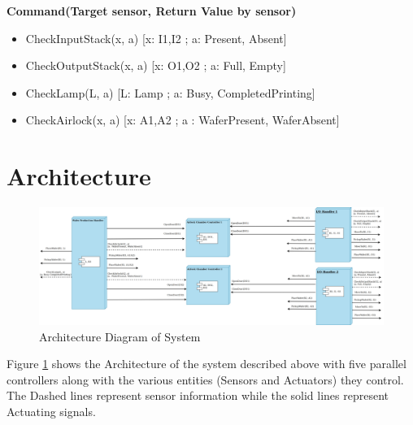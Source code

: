\documentclass[a4paper,12pt]{article}
\begin{document}
\textbf{Command(Target sensor, Return Value by sensor)}
\begin{itemize}
\item CheckInputStack(x, a)              [x: I1,I2 ; a: Present, Absent] 
\item CheckOutputStack(x, a)          [x: O1,O2 ; a: Full, Empty]
\item CheckLamp(L, a)	                  [L: Lamp ; a: Busy, CompletedPrinting]	
\item CheckAirlock(x, a)                    [x: A1,A2 ; a : WaferPresent, WaferAbsent]  %
\end{itemize}
\newpage
\section{Architecture}
\begin{figure}[h!]
  \includegraphics[width=\linewidth]{Architecture.jpg}
  \caption{Architecture Diagram of System}
  \label{fig:arch1}
\end{figure}
Figure \ref{fig:arch1} shows the Architecture of the system described above with five parallel controllers along with the various entities (Sensors and Actuators) they control. The Dashed lines represent sensor information while the solid lines represent Actuating signals.
\end{document}
